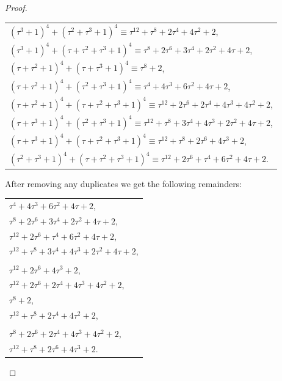 \documentclass[12pt]{article}
\theoremstyle{remark}
\begin{document}
\begin{proof}
\begin{center}
\begin{tabular}{@{}l@{}}
    $(\tau^3+1)^4 + (\tau^2+\tau^3+1)^4 \equiv \tau^{12}+\tau^8+2\tau^4+4\tau^2+2$, \\
     
    
    $(\tau^3+1)^4 + (\tau+\tau^2+\tau^3+1)^4 \equiv \tau^8+2\tau^6+3\tau^4+2\tau^2+4\tau+2$, \\

      
    $(\tau+\tau^2+1)^4 + (\tau+\tau^3+1)^4 \equiv \tau^8+2$, \\
     
    $(\tau+\tau^2+1)^4 + (\tau^2+\tau^3+1)^4 \equiv \tau^4+4\tau^3+6\tau^2+4\tau+2$, \\
    $(\tau+\tau^2+1)^4 + (\tau+\tau^2+\tau^3+1)^4 \equiv \tau^{12}+2\tau^6+2\tau^4+4\tau^3+4\tau^2+2$, \\
         
    $(\tau+\tau^3+1)^4 + (\tau^2+\tau^3+1)^4 \equiv \tau^{12}+\tau^8+3\tau^4+4\tau^3+2\tau^2+4\tau+2$, \\
    $(\tau+\tau^3+1)^4 + (\tau+\tau^2+\tau^3+1)^4 \equiv \tau^{12}+\tau^8+2\tau^6+4\tau^3+2$, \\
    $(\tau^2+\tau^3+1)^4 + (\tau+\tau^2+\tau^3+1)^4 \equiv \tau^{12}+2\tau^6+\tau^4+6\tau^2+4\tau+2. $
\end{tabular}
\end{center}
After removing any duplicates we get the following remainders:
\begin{center}
\begin{tabular}{@{}l@{}}
    $\tau^4 + 4\tau^3 + 6\tau^2 + 4\tau +2$, \\
    $\tau^8 + 2\tau^6 + 3\tau^4 + 2\tau^2 + 4\tau + 2  $, \\
    $\tau^{12} + 2\tau^6 + \tau^4 + 6\tau^2 + 4\tau +2$, \\
    $\tau^{12}+\tau^8+3\tau^4+4\tau^3+2\tau^2+4\tau+2$, \\
    \\
    $\tau^{12} + 2\tau^6 + 4\tau^3 + 2$, \\
    $\tau^{12}+ 2\tau^6 + 2\tau^4 + 4\tau^3 + 4\tau^2 + 2$, \\
    $\tau^8 + 2$, \\
    $\tau^{12}+\tau^8+2\tau^4+4\tau^2+2$, \\
    \\
    $\tau^8+2\tau^6+2\tau^4+4\tau^3+4\tau^2+2$,  \\
    $\tau^{12}+\tau^8+2\tau^6+4\tau^3+2$.
\end{tabular}
\end{center}


\end{proof}
\end{document}
